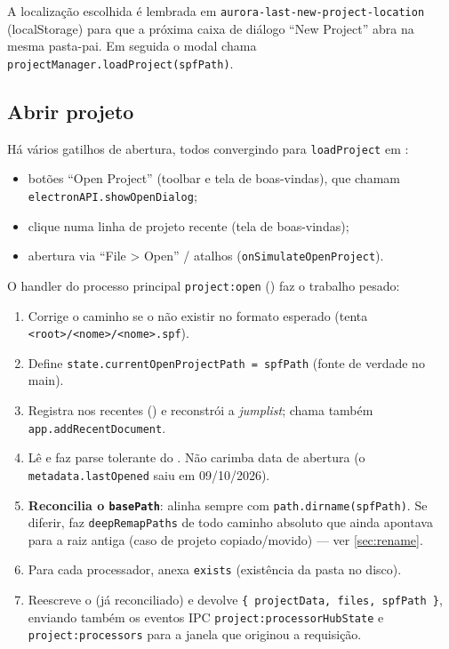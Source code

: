A localização escolhida é lembrada em
\lstinline|aurora-last-new-project-location| (localStorage) para que a próxima
caixa de diálogo \enquote{New Project} abra na mesma pasta-pai. Em seguida o
modal chama \lstinline|projectManager.loadProject(spfPath)|.

\subsection{Abrir projeto}

Há vários gatilhos de abertura, todos convergindo para
\lstinline|loadProject| em :

\begin{itemize}[leftmargin=1.6em]
  \item botões \enquote{Open Project} (toolbar e tela de boas-vindas), que
    chamam \lstinline|electronAPI.showOpenDialog|;
  \item clique numa linha de projeto recente (tela de boas-vindas);
  \item abertura via \enquote{File > Open} / atalhos
    (\lstinline|onSimulateOpenProject|).
\end{itemize}

O handler do processo principal \lstinline|project:open|
() faz o trabalho pesado:

\begin{enumerate}[leftmargin=1.8em]
  \item Corrige o caminho se o  não existir no formato esperado
    (tenta \lstinline|<root>/<nome>/<nome>.spf|).
  \item Define \lstinline|state.currentOpenProjectPath = spfPath| (fonte de
    verdade no main).
  \item Registra nos recentes () e reconstrói a
    \emph{jumplist}; chama também \lstinline|app.addRecentDocument|.
  \item Lê e faz parse tolerante do . Não carimba data de
    abertura (o \lstinline|metadata.lastOpened| saiu em 09/10/2026).
  \item \textbf{Reconcilia o \lstinline|basePath|}: alinha sempre com
    \lstinline|path.dirname(spfPath)|. Se diferir, faz \lstinline|deepRemapPaths|
    de todo caminho absoluto que ainda apontava para a raiz antiga (caso de
    projeto copiado/movido) — ver \autoref{sec:rename}.
  \item Para cada processador, anexa \lstinline|exists| (existência da pasta no
    disco).
  \item Reescreve o  (já reconciliado) e devolve
    \lstinline|{ projectData, files, spfPath }|, enviando também os eventos IPC
    \lstinline|project:processorHubState| e \lstinline|project:processors| para
    a janela que originou a requisição.
\end{enumerate}

